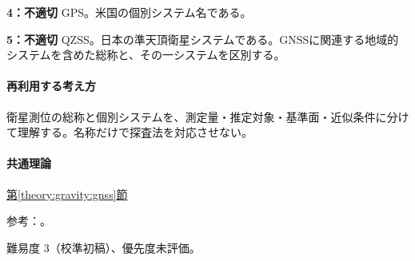 \noindent\textbf{4：不適切} GPS。米国の個別システム名である。\par

\noindent\textbf{5：不適切} QZSS。日本の準天頂衛星システムである。GNSSに関連する地域的システムを含めた総称と、その一システムを区別する。\par

\paragraph{再利用する考え方} 衛星測位の総称と個別システムを、測定量・推定対象・基準面・近似条件に分けて理解する。名称だけで探査法を対応させない。

\paragraph{共通理論} \hyperref[theory:gravity:gnss]{第\ref*{theory:gravity:gnss}節}

\par 参考：\cite{gsi_gnss}。

\par 難易度 3（校準初稿）、優先度未評価。
